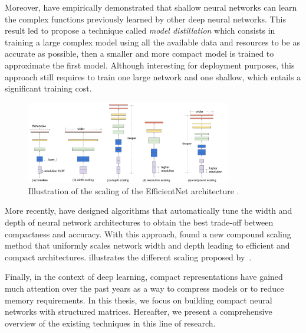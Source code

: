 Moreover, \citet{ba2014deep} have empirically demonstrated that shallow neural networks can learn the complex functions previously learned by other deep neural networks.
This result led \citet{hinton2015distilling} to propose a technique called \emph{model distillation} which consists in training a large complex model using all the available data and resources to be as accurate as possible, then a smaller and more compact model is trained to approximate the first model.
Although interesting for deployment purposes, this approach still requires to train one large network and one shallow, which entails a significant training cost.

\begin{figure}[t]
  \centering
  \includegraphics[width=0.80\textwidth]{figures/main/ch3-related_work/scalecompare.pdf}
  \caption{Illustration of the scaling of the EfficientNet architecture \cite{tan2019efficientnet}.}
  \label{figure:p1-ch3-illustration_efficientnet}
\end{figure}

More recently, \citet{zoph2018learning,real2019regularized} have designed algorithms that automatically tune the width and depth of neural network architectures to obtain the best trade-off between compactness and accuracy.
With this approach, \citet{tan2019efficientnet} found a new compound scaling method that uniformly scales network width and depth leading to efficient and compact architectures.
 illustrates the different scaling proposed by~\citet{tan2019efficientnet}.

Finally, in the context of deep learning, compact representations have gained much attention over the past years as a way to compress models or to reduce memory requirements.
In this thesis, we focus on building compact neural networks with structured matrices.
Hereafter, we present a comprehensive overview of the existing techniques in this line of research.












